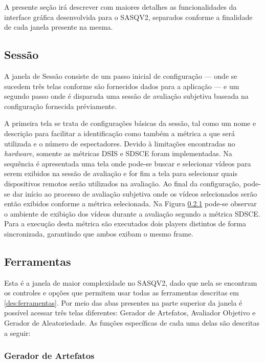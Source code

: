 A presente seção irá descrever com maiores detalhes as funcionalidades da interface gráfica desenvolvida para o SASQV2, separados conforme a finalidade de cada janela presente na mesma.

\subsection{Sessão}

A janela de Sessão consiste de um passo inicial de configuração --- onde se sucedem três telas conforme são fornecidos dados para a aplicação --- e um segundo passo onde é disparada uma sessão de avaliação subjetiva baseada na configuração fornecida préviamente.

A primeira tela se trata de configurações básicas da sessão, tal como um nome e descrição para facilitar a identificação como também a métrica a que será utilizada e o número de espectadores. Devido à limitações encontradas no \emph{hardware}, somente as métricas DSIS e SDSCE foram implementadas.
Na sequência é apresentada uma tela onde pode-se buscar e selecionar vídeos para serem exibidos na sessão de avaliação e for fim a tela para selecionar quais dispositivos remotos serão utilizados na avaliação. Ao final da configuração, pode-se dar início ao processo de avaliação subjetiva onde os vídeos selecionados serão então exibidos conforme a métrica selecionada.
Na Figura \ref{} pode-se observar o ambiente de exibição dos vídeos durante a avaliação segundo a métrica SDSCE.
Para a execução desta métrica são executados dois players distintos de forma sincronizada, garantindo que ambos exibam o mesmo frame.


\subsection{Ferramentas}

Esta é a janela de maior complexidade no SASQV2, dado que nela se encontram os controles e opções que permitem usar todas as ferramentas descritas em \ref{des:ferramentas}. 
Por meio das abas presentes na parte superior da janela é possível acessar três telas diferentes: Gerador de Artefatos, Avaliador Objetivo e Gerador de Aleatoriedade. As funções específicas de cada uma delas são descritas a seguir:

\subsubsection{Gerador de Artefatos}

